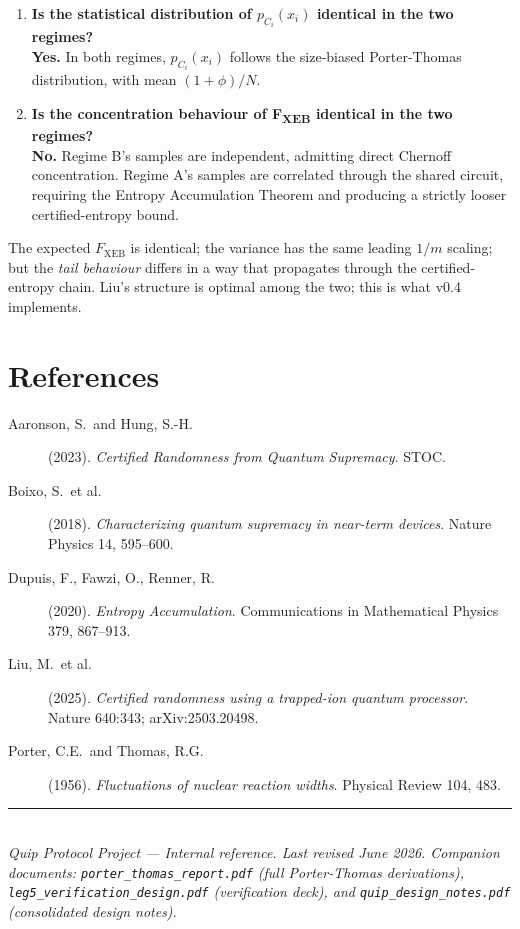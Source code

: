 \documentclass[11pt]{article}
\theoremstyle{definition}
\theoremstyle{remark}
\begin{document}
\begin{enumerate}
\item \textbf{Is the statistical distribution of $p_{C_i}(x_i)$
identical in the two regimes?} \\
\textbf{Yes.} In both regimes, $p_{C_i}(x_i)$ follows the size-biased
Porter-Thomas distribution, with mean $(1+\phi)/N$.
\item \textbf{Is the concentration behaviour of F\textsubscript{XEB}
identical in the two regimes?} \\
\textbf{No.} Regime B's samples are independent, admitting direct Chernoff
concentration. Regime A's samples are correlated through the shared
circuit, requiring the Entropy Accumulation Theorem and producing a
strictly looser certified-entropy bound.
\end{enumerate}

The expected $F_{\mathrm{XEB}}$ is identical; the variance has the same
leading $1/m$ scaling; but the \emph{tail behaviour} differs in a way
that propagates through the certified-entropy chain. Liu's structure is
optimal among the two; this is what v0.4 implements.

\section*{References}

\begin{description}
\item[Aaronson, S.\ and Hung, S.-H.] (2023).
  \emph{Certified Randomness from Quantum Supremacy}. STOC.

\item[Boixo, S.\ et al.] (2018).
  \emph{Characterizing quantum supremacy in near-term devices}. Nature
  Physics 14, 595--600.

\item[Dupuis, F., Fawzi, O., Renner, R.] (2020).
  \emph{Entropy Accumulation}. Communications in Mathematical Physics 379,
  867--913.

\item[Liu, M.\ et al.] (2025).
  \emph{Certified randomness using a trapped-ion quantum processor}.
  Nature 640:343; arXiv:2503.20498.

\item[Porter, C.E.\ and Thomas, R.G.] (1956).
  \emph{Fluctuations of nuclear reaction widths}. Physical Review 104,
  483.
\end{description}

\vfill

\noindent\rule{\linewidth}{0.4pt}\\[2pt]
\textit{Quip Protocol Project --- Internal reference. Last revised June 2026.
Companion documents: \texttt{porter\_thomas\_report.pdf} (full
Porter-Thomas derivations), \texttt{leg5\_verification\_design.pdf}
(verification deck), and \texttt{quip\_design\_notes.pdf} (consolidated
design notes).}
\end{document}
